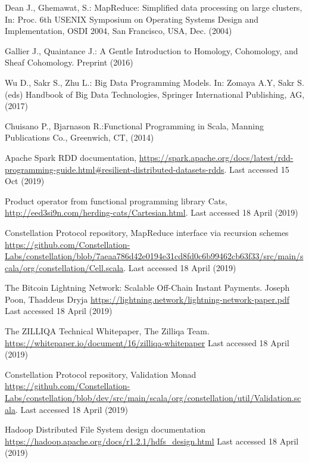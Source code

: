 \documentclass[runningheads]{llncs}
\begin{document}
\begin{thebibliography}{8}
Dean J., Ghemawat, S.: MapReduce: Simplified data processing on large clusters, In: Proc. 6th USENIX Symposium on Operating Systems Design and Implementation, OSDI 2004, San Francisco, USA, Dec. (2004)

Gallier J., Quaintance J.: A Gentle Introduction to Homology, Cohomology, and Sheaf Cohomology. Preprint (2016)

Wu D., Sakr S., Zhu L.: Big Data Programming Models. In: Zomaya A.Y, Sakr S. (eds) Handbook of Big Data Technologies, Springer International Publishing, AG, (2017)

Chuisano P., Bjarnason R.:Functional Programming in Scala, Manning Publications Co., Greenwich, CT, (2014)

Apache Spark RDD documentation, \url{https://spark.apache.org/docs/latest/rdd-programming-guide.html\#resilient-distributed-datasets-rdds}. Last accessed 15 Oct (2019)

Product operator from functional programming library Cats, \url{http://eed3si9n.com/herding-cats/Cartesian.html}. Last accessed 18 April (2019)

Constellation Protocol repository, MapReduce interface via recursion schemes \url{https://github.com/Constellation-Labs/constellation/blob/7aeaa786d42e0194e31cd8fd0c6b99462cb63f33/src/main/scala/org/constellation/Cell.scala}. Last accessed 18 April (2019)

The Bitcoin Lightning Network: Scalable Off-Chain Instant Payments. Joseph Poon, Thaddeus Dryja \url{https://lightning.network/lightning-network-paper.pdf} Last accessed 18 April (2019)

The ZILLIQA Technical Whitepaper, The Zilliqa Team. \url{https://whitepaper.io/document/16/zilliqa-whitepaper} Last accessed 18 April (2019)

Constellation Protocol repository, Validation Monad \url{https://github.com/Constellation-Labs/constellation/blob/dev/src/main/scala/org/constellation/util/Validation.scala}. Last accessed 18 April (2019)

Hadoop Distributed File System design documentation \url{https://hadoop.apache.org/docs/r1.2.1/hdfs\_design.html} Last accessed 18 April (2019) 

\end{thebibliography}
\end{document}
